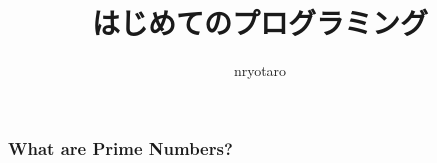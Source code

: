 \documentclass[unicode]{beamer}
\title{はじめてのプログラミング}
\author{nryotaro}
\institute{doge}
\begin{document}
\begin{frame}
\titlepage
\end{frame}
\begin{frame}
\frametitle{What are Prime Numbers?}
\end{frame}
\end{document}
